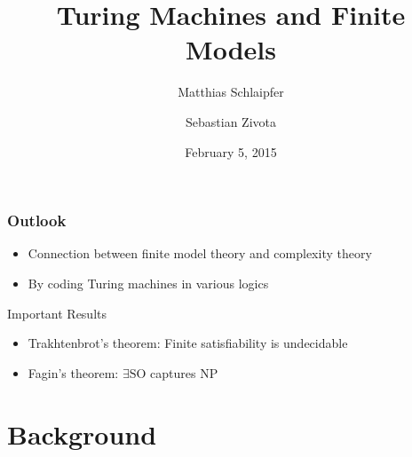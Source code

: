 \documentclass[handout]{beamer}
\title{Turing Machines and Finite Models}
\author{Matthias Schlaipfer \and Sebastian Zivota}
\date{February 5, 2015}
\newcommand{\SO}{\ensuremath{\mathrm{SO}}}
\begin{document}
\begin{frame}[plain]
	\titlepage
\end{frame}


\begin{frame}
  \frametitle{Outlook}
  \begin{itemize}
    \item Connection between finite model theory and complexity theory
    \item By coding Turing machines in various logics
  \end{itemize}
  \vspace{2em} 
  \begin{alertblock}{Important Results}
  \begin{itemize}
    \item Trakhtenbrot's theorem: Finite satisfiability is undecidable
    \item Fagin's theorem: $\exists \SO$ captures $\mathrm{NP}$
  \end{itemize}
  \end{alertblock}
\end{frame}

\section{Background}
\end{document}
